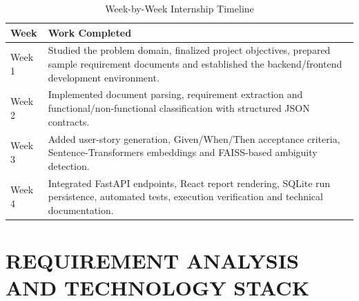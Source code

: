 \documentclass[12pt,a4paper,openany]{report}
\begin{document}
\begin{table}[H]
\centering
\caption{Week-by-Week Internship Timeline}
\label{tab:timeline}
\begin{tabularx}{\textwidth}{|p{2.2cm}|X|}
\hline
\textbf{Week} & \textbf{Work Completed} \\
\hline
Week 1 & Studied the problem domain, finalized project objectives, prepared sample requirement documents and established the backend/frontend development environment. \\
\hline
Week 2 & Implemented document parsing, requirement extraction and functional/non-functional classification with structured JSON contracts. \\
\hline
Week 3 & Added user-story generation, Given/When/Then acceptance criteria, Sentence-Transformers embeddings and FAISS-based ambiguity detection. \\
\hline
Week 4 & Integrated FastAPI endpoints, React report rendering, SQLite run persistence, automated tests, execution verification and technical documentation. \\
\hline
\end{tabularx}
\end{table}

\chapter{REQUIREMENT ANALYSIS AND TECHNOLOGY STACK}
\end{document}
